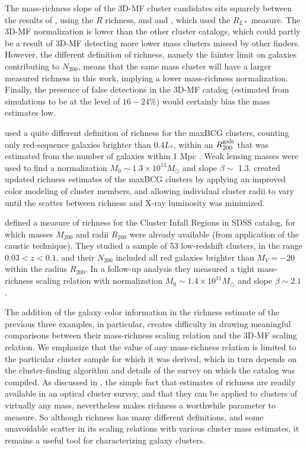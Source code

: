 The mass-richness slope of the \ac{3D-MF} cluster candidates sits squarely between the results of \citet{Wen09}, using the $R$ richness, and \citet{Wen12} and \citet{Covone14}, which used the $R_{L*}$ measure. The \ac{3D-MF} normalization is lower than the other cluster catalogs, which could partly be a result of \ac{3D-MF} detecting more lower mass clusters missed by other finders. However, the different definition of richness, namely the fainter limit on galaxies contributing to $N_{200}$, means that the same mass cluster will have a larger measured richness in this work, implying a lower mass-richness normalization. Finally, the presence of false detections in the \ac{3D-MF} catalog (estimated from simulations to be at the level of $16-24$\%) would certainly bias the mass estimates low.

\citet{Johnston07} used a quite different definition of richness for the maxBCG clusters, counting only red-sequence galaxies brighter than 0.4$L_*$, within an $R_{200}^{\rm gals}$ that was estimated from the number of galaxies within 1 Mpc \citep[following a prescription in][]{Hansen05}. Weak lensing masses were used to find a normalization $M_0 \sim 1.3 \times 10^{14} M_{\odot}$ and slope $\beta \sim$ 1.3. \citet{Rozo09b} created updated richness estimates of the maxBCG clusters by applying an improved color modeling of cluster members, and allowing individual cluster radii to vary until the scatter between richness and X-ray luminosity was minimized.

\citet{Andreon10} defined a measure of richness for the Cluster Infall Regions in \ac{SDSS} catalog, for which masses $M_{200}$ and radii $R_{200}$ were already available (from application of the caustic technique). They studied a sample of 53 low-redshift clusters, in the range $0.03 < z < 0.1$, and their $N_{200}$ included all red galaxies brighter than $M_V = -20$ within the radius $R_{200}$. In a follow-up analysis they measured a tight mass-richness scaling relation with normalization $M_0 \sim 1.4 \times 10^{11} M_{\odot}$ and slope $\beta \sim 2.1$ \citep{Andreon12}.

The addition of the galaxy color information in the richness estimate of the previous three examples, in particular, creates difficulty in drawing meaningful comparisons between their mass-richness scaling relation and the \ac{3D-MF} scaling relation. We emphasize that the value of any mass-richness relation is limited to the particular cluster sample for which it was derived, which in turn depends on the cluster-finding algorithm and details of the survey on which the catalog was compiled. As discussed in \citet{Rozo09b}, the simple fact that estimates of richness are readily available in an optical cluster survey, and that they can be applied to clusters of virtually any mass, nevertheless makes richness a worthwhile parameter to measure. So although richness has many different definitions, and some unavoidable scatter in its scaling relations with various cluster mass estimates, it remains a useful tool for characterizing galaxy clusters. 


